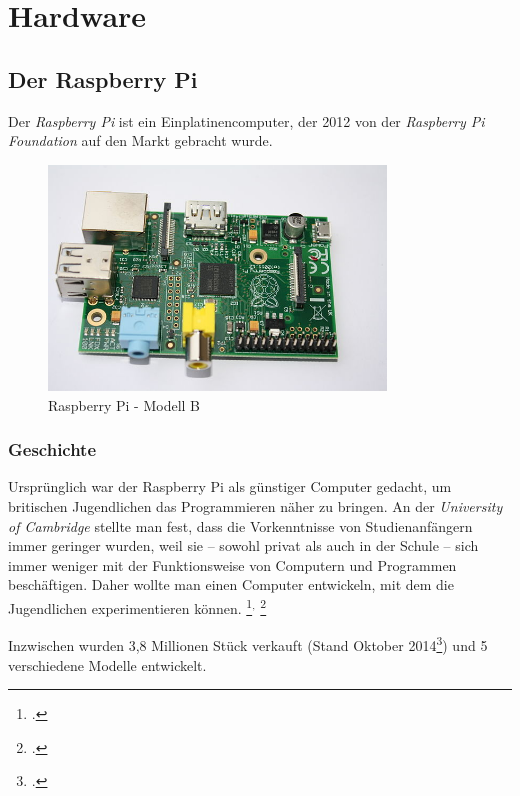 \chapter{Hardware}
\label{cha:Hardware}

\section{Der Raspberry Pi}
\label{sec:Raspberry}
Der \emph{Raspberry Pi} ist ein \gls{Einplatinencomputer}, der 2012 von der \emph{Raspberry Pi Foundation} auf den Markt gebracht wurde.

\begin{figure}[h]
  \centering
     \includegraphics[width=0.8\textwidth]{figures/raspberry.jpg}
 \caption[Raspberry Pi - Modell B]{Raspberry Pi - Modell B\footnotemark}
  \label{fig:raspberry}
\end{figure}

\subsection{Geschichte}
\label{subsec:Geschichte}
Ursprünglich war der Raspberry Pi als günstiger Computer gedacht, um britischen Jugendlichen das Programmieren näher zu bringen. An der \emph{University of Cambridge} stellte man fest, dass die Vorkenntnisse von Studienanfängern immer geringer wurden, weil sie -- sowohl privat als auch in der Schule -- sich immer weniger mit der Funktionsweise von Computern und Programmen beschäftigen. Daher wollte man einen Computer entwickeln, mit dem die Jugendlichen experimentieren können.
\footcite{aboutraspberry}$^,$
\footcite[Geschichte]{wiki:raspberry}

Inzwischen wurden 3,8 Millionen Stück verkauft (Stand Oktober 2014\footcite{verkauf}) und 5 verschiedene Modelle entwickelt.

